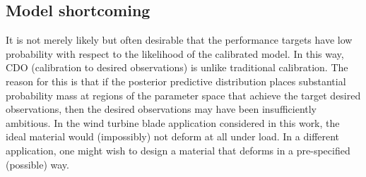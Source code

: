 \documentclass{article}
\begin{document}
\subsection{Model shortcoming}\label{model_shortcoming}

It is not merely likely but often desirable that the performance targets have low probability with respect to the likelihood of the calibrated model. 
%
In this way, CDO (calibration to desired observations) is unlike traditional calibration. 
%
The reason for this is that if the posterior predictive distribution places substantial probability mass at regions of the parameter space that achieve the target desired observations, then the desired observations may have been insufficiently ambitious. 
In the wind turbine blade application considered in this work, the ideal material would (impossibly) not deform at all under load.
In a different application, one might wish to design a material that deforms in a pre-specified (possible) way. 
\end{document}
